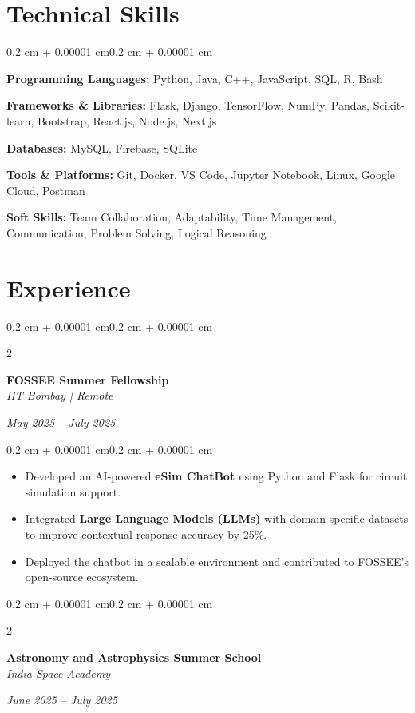 \documentclass[10pt, letterpaper]{article}
\newenvironment{highlights}{
    \begin{itemize}[
        topsep=0.10 cm,
        parsep=0.10 cm,
        partopsep=0pt,
        itemsep=0pt,
        leftmargin=0.4 cm + 10pt
    ]
}{
    \end{itemize}
}
\newenvironment{onecolentry}{
    \begin{adjustwidth}{0.2 cm + 0.00001 cm}{0.2 cm + 0.00001 cm}
}{
    \end{adjustwidth}
}
\newenvironment{twocolentry}[2][]{
    \onecolentry
    \def\secondColumn{#2}
    \setcolumnwidth{\fill, 4.5 cm}
    \begin{paracol}{2}
}{
    \switchcolumn \raggedleft \secondColumn
    \end{paracol}
    \endonecolentry
}
\begin{document}
\section{Technical Skills}
\begin{onecolentry}
    \textbf{Programming Languages:} Python, Java, C++, JavaScript, SQL, R, Bash

    \textbf{Frameworks \& Libraries:} Flask, Django, TensorFlow, NumPy, Pandas, Scikit-learn, Bootstrap, React.js, Node.js, Next.js

    \textbf{Databases:} MySQL, Firebase, SQLite

    \textbf{Tools \& Platforms:} Git, Docker, VS Code, Jupyter Notebook, Linux, Google Cloud, Postman

    \textbf{Soft Skills:} Team Collaboration, Adaptability, Time Management, Communication, Problem Solving, Logical Reasoning
\end{onecolentry}

\section{Experience}

\begin{twocolentry}{
    \textit{May 2025 -- July 2025}
}
    \textbf{FOSSEE Summer Fellowship} \\
    \textit{IIT Bombay | Remote}
\end{twocolentry}

\begin{onecolentry}
    \begin{highlights}
        \item Developed an AI-powered \textbf{eSim ChatBot} using Python and Flask for circuit simulation support.
        \item Integrated \textbf{Large Language Models (LLMs)} with domain-specific datasets to improve contextual response accuracy by 25\%.
        \item Deployed the chatbot in a scalable environment and contributed to FOSSEE’s open-source ecosystem.
    \end{highlights}
\end{onecolentry}

\begin{twocolentry}{
    \textit{June 2025 -- July 2025}
}
    \textbf{Astronomy and Astrophysics Summer School} \\
    \textit{India Space Academy}
\end{twocolentry}
\end{document}
